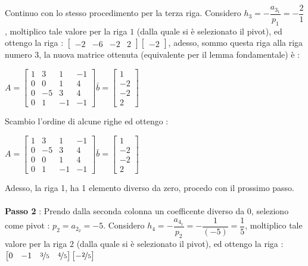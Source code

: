 \documentclass[12pt, letterpaper]{article}
\newcommand{\acc}{\\\hphantom{}\\}
\begin{document}
Continuo con lo stesso procedimento per la terza riga.  Considero \(h_3 = -\dfrac{a_{3_1}}{p_1}=-\dfrac{2}{1}\),  moltiplico tale valore per la 
riga \(1\) (dalla quale si è selezionato il pivot), ed ottengo la riga : \(\begin{bmatrix}
    -2&-6&-2&2
\end{bmatrix}\begin{bmatrix}
    -2
\end{bmatrix}\), adesso, sommo questa riga alla riga numero 3, la nuova matrice ottenuta (equivalente per 
il lemma fondamentale) è :
\begin{center}\(
    A=\begin{bmatrix}
        1&3&1&-1\\
        0&0&1&4\\
        0&-5&3&4\\
        0&1&-1&-1
    \end{bmatrix}\bar b = \begin{bmatrix}
        1\\
        -2\\
        -2\\
        2
    \end{bmatrix}
\)\end{center}
Scambio l'ordine di alcune righe ed ottengo : 
\begin{center}\(
    A=\begin{bmatrix}
        1&3&1&-1\\
        0&-5&3&4\\
        0&0&1&4\\
        0&1&-1&-1
    \end{bmatrix}\bar b = \begin{bmatrix}
        1\\
        -2\\
        -2\\
        2
    \end{bmatrix}
\)\end{center}
Adesso, la riga 1, ha 1 elemento diverso da zero, procedo con il prossimo passo.\acc 
\textbf{Passo 2} : Prendo dalla seconda colonna un coefficente diverso da 0, seleziono come 
pivot : \(p_2=a_{2_2}=-5\). Considero \(h_4 = -\dfrac{a_{4_1}}{p_2}=-\dfrac{1}{(-5)}=\dfrac{1}{5}\),  moltiplico tale valore per la 
riga \(2\) (dalla quale si è selezionato il pivot), ed ottengo la riga : \(\begin{bmatrix}
    0&-1&\nicefrac{3}{5}&\nicefrac{4}{5}
\end{bmatrix}\begin{bmatrix}
    -\nicefrac{2}{5}
\end{bmatrix}\)
\end{document}
